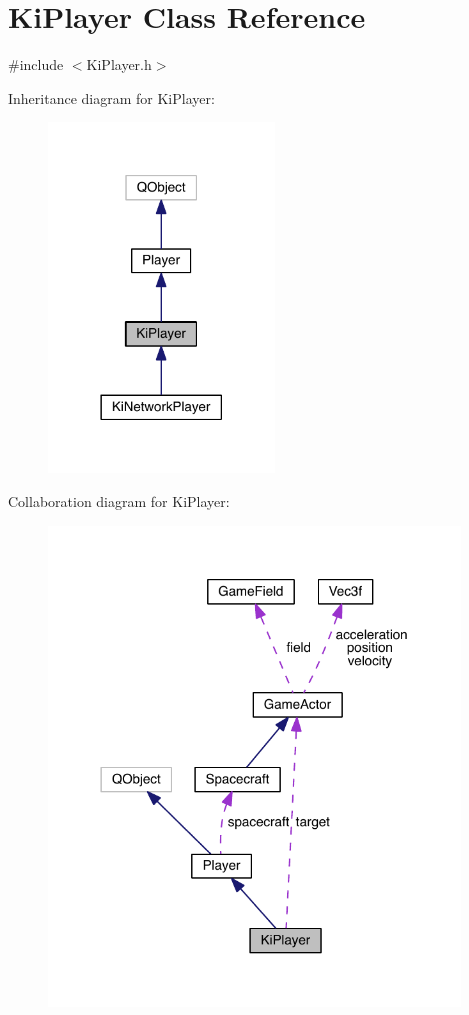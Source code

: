 \hypertarget{class_ki_player}{\section{Ki\+Player Class Reference}
\label{class_ki_player}
}


{\ttfamily \#include $<$Ki\+Player.\+h$>$}



Inheritance diagram for Ki\+Player\+:\nopagebreak
\begin{figure}[H]
\begin{center}
\leavevmode
\includegraphics[width=170pt]{class_ki_player__inherit__graph}
\end{center}
\end{figure}


Collaboration diagram for Ki\+Player\+:\nopagebreak
\begin{figure}[H]
\begin{center}
\leavevmode
\includegraphics[width=310pt]{class_ki_player__coll__graph}
\end{center}
\end{figure}
